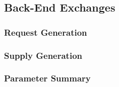 \subsection{Back-End Exchanges}\label{method:setup:back}

\subsubsection{Request Generation}

\subsubsection{Supply Generation}

\subsubsection{Parameter Summary}
